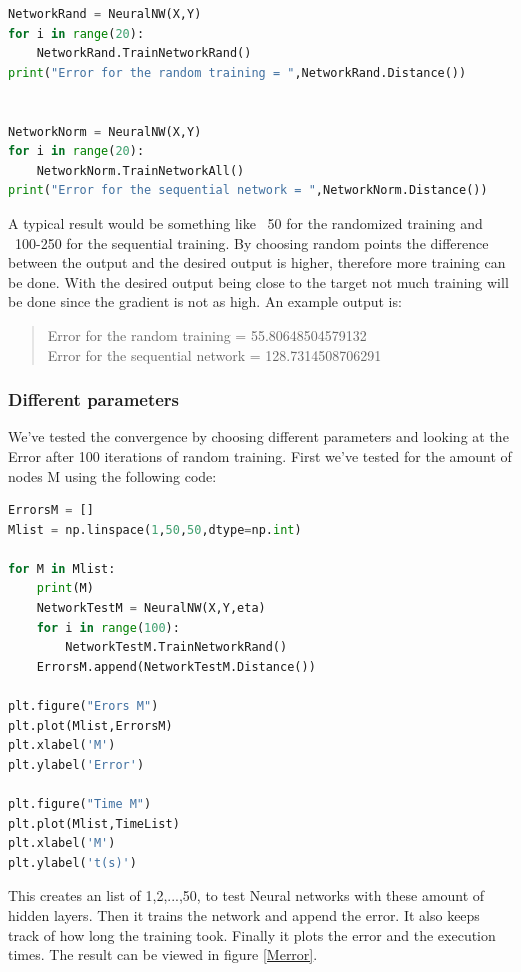 \documentclass[a4paper]{article}
\begin{document}
\begin{lstlisting}[language=Python]
NetworkRand = NeuralNW(X,Y)
for i in range(20):
    NetworkRand.TrainNetworkRand()
print("Error for the random training = ",NetworkRand.Distance())


NetworkNorm = NeuralNW(X,Y)
for i in range(20):
    NetworkNorm.TrainNetworkAll()
print("Error for the sequential network = ",NetworkNorm.Distance())
\end{lstlisting}

A typical result would be something like ~50 for the randomized training and ~100-250 for the sequential training. By choosing random points the difference between the output and the desired output is higher, therefore more training can be done. With the desired output being close to the target not much training will be done since the gradient is not as high. An example output is:

\begin{quote}
Error for the random training =  55.80648504579132\\
Error for the sequential network =  128.7314508706291
\end{quote}

\subsubsection*{Different parameters}

We've tested the convergence by choosing different parameters and looking at the Error after 100 iterations of random training.
First we've tested for the amount of nodes M using the following code:


\begin{lstlisting}[language=Python]
ErrorsM = []
Mlist = np.linspace(1,50,50,dtype=np.int)

for M in Mlist:
    print(M)
    NetworkTestM = NeuralNW(X,Y,eta)
    for i in range(100):
        NetworkTestM.TrainNetworkRand()
    ErrorsM.append(NetworkTestM.Distance())

plt.figure("Erors M")
plt.plot(Mlist,ErrorsM)
plt.xlabel('M')
plt.ylabel('Error')

plt.figure("Time M")
plt.plot(Mlist,TimeList)
plt.xlabel('M')
plt.ylabel('t(s)')
\end{lstlisting}

This creates an list of 1,2,...,50, to test Neural networks with these amount of hidden layers. Then it trains the network and append the error. It also keeps track of how long the training took. Finally it plots the error and the execution times.
The result can be viewed in figure \ref{Merror}.
\end{document}
